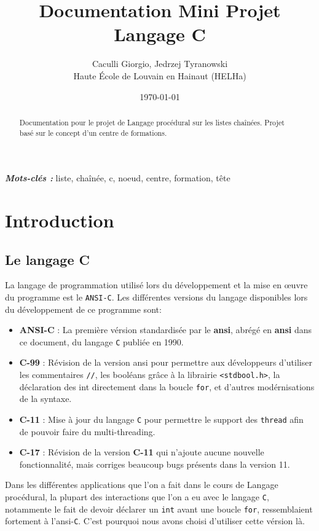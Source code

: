 \documentclass[11pt]{article}
\title{Documentation Mini Projet Langage C}
\author{Caculli Giorgio, Jedrzej Tyranowski\\Haute École de Louvain en Hainaut (HELHa)}
\date{\today}
\begin{document}
\maketitle
\begin{abstract}
  Documentation pour le projet de Langage procédural sur les listes chaînées. Projet basé sur le concept
  d'un centre de formations.
\end{abstract}
\textbf{\textit{Mots-clés : }}liste, chaînée, c, noeud, centre, formation, tête

\newpage
\tableofcontents

\newpage
\section{Introduction}

\subsection{Le langage C}
La langage de programmation utilisé lors du développement et la mise en \oe{}uvre du programme est le
\texttt{ANSI-C}. Les différentes versions du langage disponibles lors du développement de ce programme sont:
\begin{itemize}
\item \textbf{ANSI-C} : La première vérsion standardisée par le \textbf{\acrlong{ansi}},
  abrégé en \textbf{\acrshort{ansi}} dans ce document, du langage \texttt{C} publiée en 1990.
\item \textbf{C-99} : Révision de la version \acrshort{ansi} pour permettre aux développeurs d'utiliser les
  commentaires \texttt{//}, les booléans grâce à la librairie \texttt{<stdbool.h>}, la déclaration des int
  directement dans la boucle \texttt{for}, et d'autres modérnisations de la syntaxe.
\item \textbf{C-11} : Mise à jour du langage \texttt{C} pour permettre le support des \texttt{thread} afin de pouvoir faire du multi-threading.
\item \textbf{C-17} : Révision de la version \textbf{C-11} qui n'ajoute aucune nouvelle fonctionnalité, mais
  corriges beaucoup bugs présents dans la version 11.
\end{itemize}
Dans les différentes applications que l'on a fait dans le cours de Langage procédural, la plupart des
interactions que l'on a eu avec le langage \texttt{C}, notammente le fait de devoir déclarer un \texttt{int}
avant une boucle \texttt{for}, ressemblaient fortement à l'\acrshort{ansi}-\texttt{C}. C'est pourquoi nous
avons choisi d'utiliser cette vérsion là.
\end{document}
